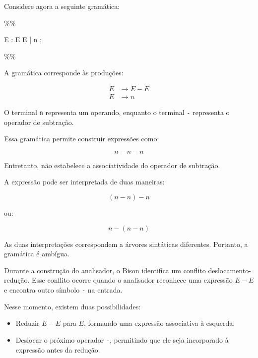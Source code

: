 \documentclass[
  brazilian,
  letterpaper,
]{book}
\newenvironment{Shaded}{\begin{snugshade}}{\end{snugshade}}
\newcommand{\BaseNTok}[1]{\textcolor[rgb]{0.68,0.00,0.00}{#1}}
\newcommand{\CharTok}[1]{\textcolor[rgb]{0.13,0.47,0.30}{#1}}
\newcommand{\NormalTok}[1]{\textcolor[rgb]{0.00,0.23,0.31}{#1}}
\newcommand{\StringTok}[1]{\textcolor[rgb]{0.13,0.47,0.30}{#1}}
\providecommand{\tightlist}{%
  \setlength{\itemsep}{0pt}\setlength{\parskip}{0pt}}
\theoremstyle{plain}
\theoremstyle{definition}
\theoremstyle{remark}
\begin{document}
Considere agora a seguinte gramática:

\begin{Shaded}
\begin{Highlighting}[]
\BaseNTok{\%\%}

\StringTok{E }\NormalTok{: E }\CharTok{\textquotesingle{}{-}\textquotesingle{}}\NormalTok{ E}
\NormalTok{  | }\CharTok{\textquotesingle{}n\textquotesingle{}}
\NormalTok{  ;}

\BaseNTok{\%\%}
\end{Highlighting}
\end{Shaded}

A gramática corresponde às produções:

\[
\begin{aligned}
E &\rightarrow E-E\\
E &\rightarrow n
\end{aligned}
\]

O terminal \texttt{\textquotesingle{}n\textquotesingle{}} representa um
operando, enquanto o terminal
\texttt{\textquotesingle{}-\textquotesingle{}} representa o operador de
subtração.

Essa gramática permite construir expressões como:

\[
n-n-n
\]

Entretanto, não estabelece a associatividade do operador de subtração.

A expressão pode ser interpretada de duas maneiras:

\[
(n-n)-n
\]

ou:

\[
n-(n-n)
\]

As duas interpretações correspondem a árvores sintáticas diferentes.
Portanto, a gramática é ambígua.

Durante a construção do analisador, o Bison identifica um conflito
deslocamento-redução. Esse conflito ocorre quando o analisador reconhece
uma expressão \(E-E\) e encontra outro símbolo
\texttt{\textquotesingle{}-\textquotesingle{}} na entrada.

Nesse momento, existem duas possibilidades:

\begin{itemize}
\tightlist
\item
  Reduzir \(E-E\) para \(E\), formando uma expressão associativa à
  esquerda.
\item
  Deslocar o próximo operador
  \texttt{\textquotesingle{}-\textquotesingle{}}, permitindo que ele
  seja incorporado à expressão antes da redução.
\end{itemize}
\end{document}
